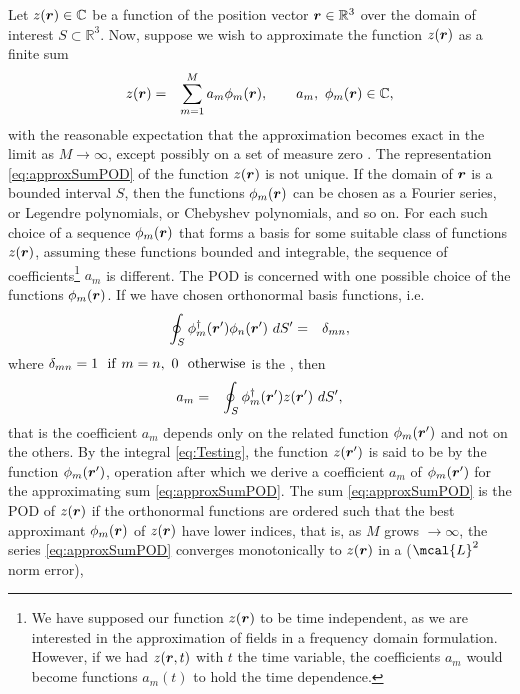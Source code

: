 \par Let $z(\mbfit{r}) \in \mathbb{C}$ be a function of the position vector $\mbfit{r} \in \mathbb{R}^3$ over the domain of interest $S \subset \mathbb{R}^3$. Now, suppose we wish to approximate the function $z(\mbfit{r})$ as a finite sum
\begin{eqnarray}
z(\mbfit{r}) &= & \sum_{m=1}^{M} a_m \phi_m(\mbfit{r}), \qquad a_m, \ \phi_m(\mbfit{r}) \in \mathbb{C},\label{eq:approxSumPOD}
\end{eqnarray} with the reasonable expectation that the approximation becomes exact in the limit as $M \rightarrow \infty$, except possibly on a set of measure zero \cite{HalmosMT}. The representation \eqref{eq:approxSumPOD} of the function $z(\mbfit{r})$ is not unique. If the domain of $\mbfit{r}$ is a bounded interval $S$, then the functions $\phi_m(\mbfit{r})$ can be chosen as a Fourier series, or Legendre polynomials, or Chebyshev polynomials, and so on. For each such choice of a sequence $\phi_m(\mbfit{r})$ that forms a basis for some suitable class of functions $z(\mbfit{r})$, assuming these functions bounded and integrable, the sequence of coefficients\footnote{We have supposed our function $z(\mbfit{r})$ to be time independent, as we are interested in the approximation of fields in a frequency domain formulation. However, if we had $z(\mbfit{r},t)$ with $t$ the time variable, the coefficients $a_m$ would become functions $a_m(t)$ to hold the time dependence.} $a_m$ is different. The POD is concerned with one possible choice of the functions $\phi_m(\mbfit{r})$. If we have chosen orthonormal basis functions, i.e.
\begin{eqnarray}
\label{eq:eigen}
\oint_S \phi_m^{\dagger}(\mbfit{r'}) \phi_n(\mbfit{r'}) \ dS' & = & \delta_{mn},
\end{eqnarray}
where $\delta_{mn} = 1 \ \ \mathrm{if} \ m = n, \ 0 \ \ \mathrm{otherwise}$ is the , then
\begin{eqnarray}
\label{eq:Testing}
a_m &= &  \oint_S \phi_m^{\dagger}(\mbfit{r'}) z(\mbfit{r'}) \ dS',
\end{eqnarray}
that is the coefficient $a_m$ depends only on the related function $\phi_m(\mbfit{r'})$ and not on the others. By the integral \eqref{eq:Testing}, the function $z(\mbfit{r'})$ is said to be  by the function $\phi_m(\mbfit{r'})$, operation after which we derive a  coefficient $a_m$ of $\phi_m(\mbfit{r'})$ for the approximating sum \eqref{eq:approxSumPOD}. The sum \eqref{eq:approxSumPOD} is the POD of $z(\mbfit{r})$ if the orthonormal functions are ordered such that the best approximant $\phi_m(\mbfit{r})$ of $z(\mbfit{r})$ have lower indices, that is, as $M$ grows $\rightarrow \infty$, the series \eqref{eq:approxSumPOD} converges monotonically to $z(\mbfit{r})$ in a  ($\mcal{L}^2$ norm error),

